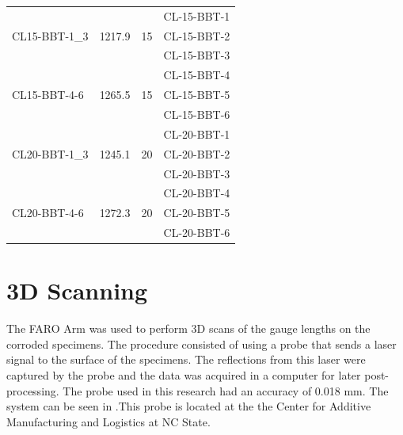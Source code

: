 \begin{table}[htbp]
\begin{tabular}{lccl}
\multirow{3}{*}{CL15-BBT-1\_3} & \multirow{3}{*}{1217.9} & \multirow{3}{*}{15} & CL-15-BBT-1           \\
                               &                         &                     & CL-15-BBT-2           \\
                               &                         &                     & CL-15-BBT-3           \\
\multirow{3}{*}{CL15-BBT-4-6}  & \multirow{3}{*}{1265.5} & \multirow{3}{*}{15} & CL-15-BBT-4           \\
                               &                         &                     & CL-15-BBT-5           \\
                               &                         &                     & CL-15-BBT-6           \\
\multirow{3}{*}{CL20-BBT-1\_3} & \multirow{3}{*}{1245.1} & \multirow{3}{*}{20} & CL-20-BBT-1           \\
                               &                         &                     & CL-20-BBT-2           \\
                               &                         &                     & CL-20-BBT-3           \\
\multirow{3}{*}{CL20-BBT-4-6}  & \multirow{3}{*}{1272.3} & \multirow{3}{*}{20} & CL-20-BBT-4           \\
                               &                         &                     & CL-20-BBT-5           \\
                               &                         &                     & CL-20-BBT-6          
\end{tabular}
\end{table}

\section{3D Scanning}

The FARO Arm \cite{FAROTechnologiesInc.2022} was used to perform 3D scans of the gauge lengths on the corroded specimens. The procedure consisted of using a probe that sends a laser signal to the surface of   the specimens. The reflections from this laser were captured by the probe and the data was acquired in a computer for later post-processing. The probe used in this research had an accuracy of 0.018 mm. The system can be seen in .This probe is located at the the Center for Additive Manufacturing and Logistics at NC State.

